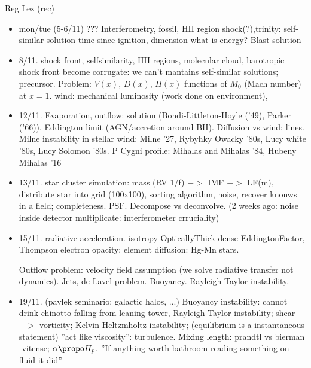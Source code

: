 \begin{frame}[allowframebreaks]{Reg Lez (rec)}
\begin{itemize}
\item mon/tue (5-6/11) ???
Interferometry, fossil, HII region shock(?),trinity: self-similar solution time since ignition, dimension what is energy?
Blast solution

\item 8/11. shock front, selfsimilarity, HII regions, molecular cloud, barotropic shock front become corrugate: we can't mantains self-similar solutions; precursor. Problem: $V(x)$, $D(x)$, $\Pi(x)$ functions of $M_0$ (Mach number) at $x=1$.
wind: mechanical luminosity (work done on environment),

\item 12/11. Evaporation, outflow: solution (Bondi-Littleton-Hoyle ('49), Parker ('66)). Eddington limit (AGN/accretion around BH). Diffusion vs wind; lines. Milne instability in stellar wind: Milne '27, Rybyhky Owacky '80s, Lucy white '80s, Lucy Solomon '80s. P Cygni profile: Mihalas and Mihalas '84, Hubeny Mihalas '16

\item 13/11. star cluster simulation: mass (RV 1/f) $->$ IMF $->$ LF(m), distribute star into grid (100x100), sorting algorithm, noise, recover knonws in a field; completeness. PSF. Decompose vs deconvolve. (2 weeks ago: noise inside detector multiplicate: interferometer crruciality)

\item 15/11. radiative acceleration. isotropy-OpticallyThick-dense-EddingtonFactor, Thompson electron opacity; element diffusion: Hg-Mn stars.

Outflow problem: velocity field assumption (we solve radiative transfer not dynamics). 
Jets, de Lavel problem. Buoyancy. Rayleigh-Taylor instability.

\item 19/11. (pavlek seminario: galactic halos, ...) Buoyancy instability: cannot drink chinotto falling from leaning tower, Rayleigh-Taylor instability; shear $->$ vorticity; Kelvin-Heltzmholtz instability; (equilibrium is a instantaneous statement) ''act like viscosity'': turbulence. Mixing length: prandtl vs bierman -vitense; $\alpha\propo H_p$. ''If anything worth bathroom reading something on fluid it did''

\end{itemize}

\end{frame}